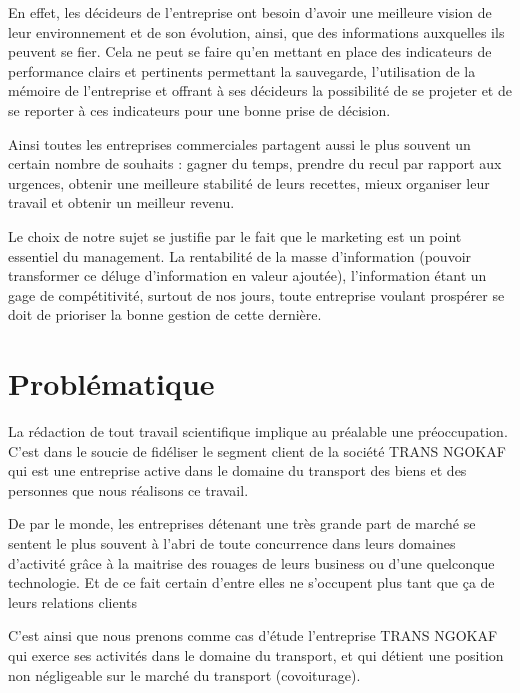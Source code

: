     En effet, les décideurs de l’entreprise ont besoin d’avoir une meilleure vision de
    leur environnement et de son évolution, ainsi, que des informations auxquelles ils peuvent
    se fier. Cela ne peut se faire qu’en mettant en place des indicateurs de performance clairs
    et pertinents permettant la sauvegarde, l’utilisation de la mémoire de l’entreprise et offrant
    à ses décideurs la possibilité de se projeter et de se reporter à ces indicateurs pour une bonne
    prise de décision.
    \newline

    Ainsi toutes les entreprises commerciales partagent aussi
    le plus souvent un certain nombre de souhaits : gagner
    du temps, prendre du recul par rapport aux urgences, obtenir une meilleure
    stabilité de leurs recettes, mieux organiser leur travail et obtenir un meilleur
    revenu. \cite*{Barouch2010}
    \newline

    Le choix de notre sujet se justifie par le fait que le marketing est un point essentiel du
    management. La rentabilité de la masse d’information (pouvoir transformer ce déluge
    d’information en valeur ajoutée), l’information étant un gage de compétitivité, surtout
    de nos jours, toute entreprise voulant prospérer se doit de prioriser la bonne gestion de
    cette dernière.
    \section[Problématique]{Problématique}
    La rédaction de tout travail scientifique implique au préalable une préoccupation.
    C’est dans le soucie de fidéliser le segment client de la société TRANS NGOKAF qui est une
    entreprise active dans le domaine du transport des biens et des personnes que nous
    réalisons ce travail.
    \newline
        
    De par le monde, les entreprises détenant une très grande part de marché
    se sentent le plus souvent à l’abri de toute concurrence dans leurs domaines d’activité
    grâce à la maitrise des rouages de leurs business ou
    d’une quelconque technologie. \cite*{Rouviere2010} Et de ce fait certain
    d’entre elles ne s’occupent plus tant que ça de leurs relations clients
    \newline

    C’est ainsi que nous prenons comme cas d’étude l’entreprise TRANS NGOKAF qui exerce 
    ses activités dans le domaine du transport, et qui détient
    une position non négligeable sur le marché du transport (covoiturage).
    \newline

